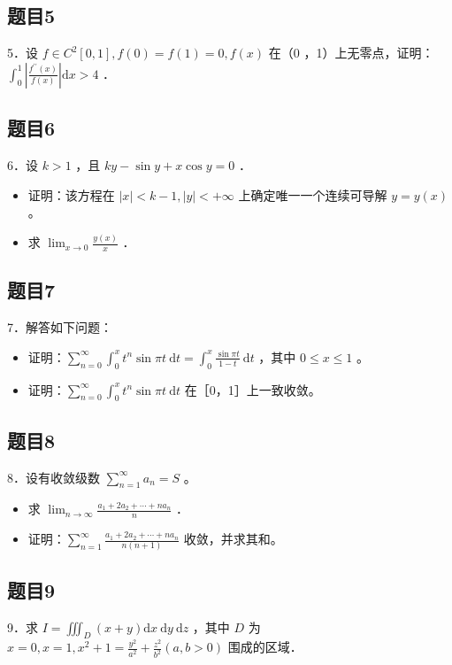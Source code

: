 \documentclass{article}
\begin{document}
\subsection{题目5}
5．设 \(f \in C^{2}[0,1], f(0)=f(1)=0, f(x)\) 在（0 ，1）上无零点，证明： \(\int_{0}^{1}\left|\frac{f^{\prime \prime}(x)}{f(x)}\right| \mathrm{d} x>4\) ．

\subsection{题目6}
6．设 \(k>1\) ，且 \(k y-\sin y+x \cos y=0\) ．

\begin{itemize}
  \item[（1）] 证明：该方程在 \(|x|<k-1,|y|<+\infty\) 上确定唯一一个连续可导解 \(y=y(x)\) 。
  \item[（2）] 求 \(\lim _{x \rightarrow 0} \frac{y(x)}{x}\) ．
\end{itemize}

\subsection{题目7}
7．解答如下问题：

\begin{itemize}
  \item[（1）] 证明：\(\sum_{n=0}^{\infty} \int_{0}^{x} t^{n} \sin \pi t \mathrm{~d} t=\int_{0}^{x} \frac{\sin \pi t}{1-t} \mathrm{~d} t\) ，其中 \(0 \leq x \leq 1\) 。
  \item[（2）] 证明：\(\sum_{n=0}^{\infty} \int_{0}^{x} t^{n} \sin \pi t \mathrm{~d} t\) 在［0，1］上一致收敛。
\end{itemize}

\subsection{题目8}
8．设有收敛级数 \(\sum_{n=1}^{\infty} a_{n}=S\) 。

\begin{itemize}
  \item[（1）] 求 \(\lim _{n \rightarrow \infty} \frac{a_{1}+2 a_{2}+\cdots+n a_{n}}{n}\) ．
  \item[（2）] 证明：\(\sum_{n=1}^{\infty} \frac{a_{1}+2 a_{2}+\cdots+n a_{n}}{n(n+1)}\) 收敛，并求其和。
\end{itemize}

\subsection{题目9}
9．求 \(I=\iiint_{D}(x+y) \mathrm{d} x \mathrm{~d} y \mathrm{~d} z\) ，其中 \(D\) 为 \(x=0, x=1, x^{2}+1=\frac{y^{2}}{a^{2}}+\frac{z^{2}}{b^{2}}(a, b>0)\) 围成的区域．
\end{document}
